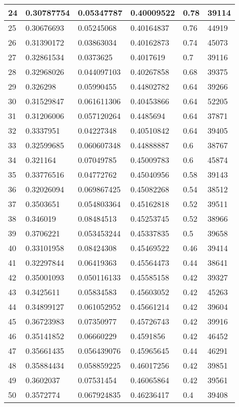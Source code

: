 \begin{longtable}{|l|l|l|l|l|l|}
24 & 0.30787754 & 0.05347787 & 0.40009522 & 0.78 & 39114 \\ \hline 
25 & 0.30676693 & 0.05245068 & 0.40164837 & 0.76 & 44919 \\ \hline 
26 & 0.31390172 & 0.03863034 & 0.40162873 & 0.74 & 45073 \\ \hline 
27 & 0.32861534 & 0.0373625 & 0.4017619 & 0.7 & 39116 \\ \hline 
28 & 0.32968026 & 0.044097103 & 0.40267858 & 0.68 & 39375 \\ \hline 
29 & 0.326298 & 0.05990455 & 0.44802782 & 0.64 & 39266 \\ \hline 
30 & 0.31529847 & 0.061611306 & 0.40453866 & 0.64 & 52205 \\ \hline 
31 & 0.31206006 & 0.057120264 & 0.4485694 & 0.64 & 37871 \\ \hline 
32 & 0.3337951 & 0.04227348 & 0.40510842 & 0.64 & 39405 \\ \hline 
33 & 0.32599685 & 0.060607348 & 0.44888887 & 0.6 & 38767 \\ \hline 
34 & 0.321164 & 0.07049785 & 0.45009783 & 0.6 & 45874 \\ \hline 
35 & 0.33776516 & 0.04772762 & 0.45040956 & 0.58 & 39143 \\ \hline 
36 & 0.32026094 & 0.069867425 & 0.45082268 & 0.54 & 38512 \\ \hline 
37 & 0.3503651 & 0.054803364 & 0.45162818 & 0.52 & 39511 \\ \hline 
38 & 0.346019 & 0.08484513 & 0.45253745 & 0.52 & 38966 \\ \hline 
39 & 0.3706221 & 0.053453244 & 0.45337835 & 0.5 & 39658 \\ \hline 
40 & 0.33101958 & 0.08424308 & 0.45469522 & 0.46 & 39414 \\ \hline 
41 & 0.32297844 & 0.06419363 & 0.45564473 & 0.44 & 38641 \\ \hline 
42 & 0.35001093 & 0.050116133 & 0.45585158 & 0.42 & 39327 \\ \hline 
43 & 0.3425611 & 0.05834583 & 0.45603052 & 0.42 & 45263 \\ \hline 
44 & 0.34899127 & 0.061052952 & 0.45661214 & 0.42 & 39604 \\ \hline 
45 & 0.36723983 & 0.07350977 & 0.45726743 & 0.42 & 39916 \\ \hline 
46 & 0.35141852 & 0.06660229 & 0.4591856 & 0.42 & 46452 \\ \hline 
47 & 0.35661435 & 0.056439076 & 0.45965645 & 0.44 & 46291 \\ \hline 
48 & 0.35884434 & 0.058859225 & 0.46017256 & 0.42 & 39851 \\ \hline 
49 & 0.3602037 & 0.07531454 & 0.46065864 & 0.42 & 39561 \\ \hline 
50 & 0.3572774 & 0.067924835 & 0.46236417 & 0.4 & 39408 \\ \hline 
\end{longtable}